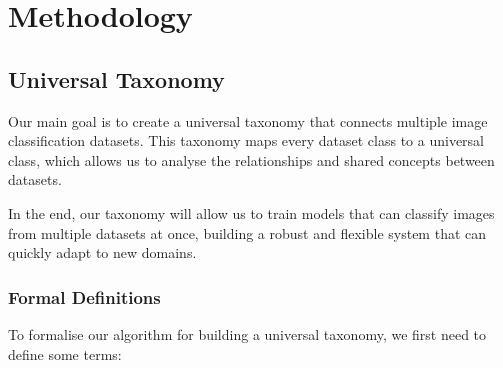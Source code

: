 \chapter{Methodology}

\section{Universal Taxonomy}

Our main goal is to create a universal taxonomy that connects multiple
image classification datasets.
This taxonomy maps every dataset class to a universal class,
which allows us to analyse the relationships and shared concepts between datasets.

In the end, our taxonomy will allow us to train models that can classify images
from multiple datasets at once, building a robust and flexible system
that can quickly adapt to new domains.

\subsection{Formal Definitions} \label{sec:taxonomy_definitions}

To formalise our algorithm for building a universal taxonomy,
we first need to define some terms:

